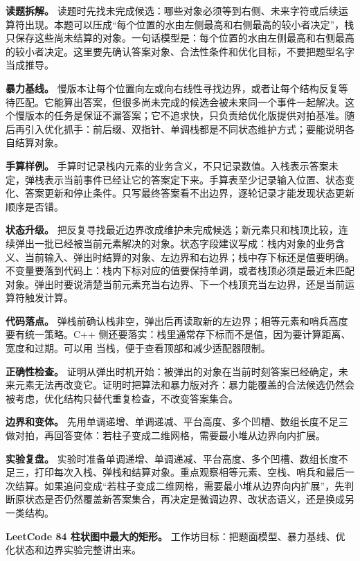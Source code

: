 \textbf{读题拆解。} 读题时先找未完成候选：哪些对象必须等到右侧、未来字符或后续运算符出现。本题可以压成“每个位置的水由左侧最高和右侧最高的较小者决定”，栈只保存这些尚未结算的对象。一句话模型是：每个位置的水由左侧最高和右侧最高的较小者决定。这里要先确认答案对象、合法性条件和优化目标，不要把题型名字当成推导。

\textbf{暴力基线。} 慢版本让每个位置向左或向右线性寻找边界，或者让每个结构反复等待匹配。它能算出答案，但很多尚未完成的候选会被未来同一个事件一起解决。这个慢版本的任务是保证不漏答案；它不追求快，只负责给优化版提供对拍基准。随后再引入优化抓手：前后缀、双指针、单调栈都是不同状态维护方式；要能说明各自结算对象。

\textbf{手算样例。} 手算时记录栈内元素的业务含义，不只记录数值。入栈表示答案未定，弹栈表示当前事件已经让它的答案定下来。手算表至少记录输入位置、状态变化、答案更新和停止条件。只写最终答案看不出边界，逐轮记录才能发现状态更新顺序是否错。

\textbf{状态升级。} 把反复寻找最近边界改成维护未完成候选；新元素只和栈顶比较，连续弹出一批已经被当前元素解决的对象。状态字段建议写成：栈内对象的业务含义、当前输入、弹出时结算的对象、左边界和右边界；栈中存下标还是值要明确。不变量要落到代码上：栈内下标对应的值要保持单调，或者栈顶必须是最近未匹配对象。弹出时要说清楚当前元素充当右边界、下一个栈顶充当左边界，还是当前运算符触发计算。

\textbf{代码落点。} 弹栈前确认栈非空，弹出后再读取新的左边界；相等元素和哨兵高度要有统一策略。C++ 侧还要落实：栈里通常存下标而不是值，因为要计算距离、宽度和过期。可以用  当栈，便于查看顶部和减少适配器限制。

\textbf{正确性检查。} 证明从弹出时机开始：被弹出的对象在当前时刻答案已经确定，未来元素无法再改变它。证明时把算法和暴力版对齐：暴力能覆盖的合法候选仍然会被考虑，优化结构只替代重复检查，不改变答案集合。

\textbf{边界和变体。} 先用单调递增、单调递减、平台高度、多个凹槽、数组长度不足三做对拍，再回答变体：若柱子变成二维网格，需要最小堆从边界向内扩展。

\textbf{实验复盘。} 实验时准备单调递增、单调递减、平台高度、多个凹槽、数组长度不足三，打印每次入栈、弹栈和结算对象。重点观察相等元素、空栈、哨兵和最后一次结算。如果追问变成“若柱子变成二维网格，需要最小堆从边界向内扩展”，先判断原状态是否仍然覆盖新答案集合，再决定是微调边界、改状态语义，还是换成另一类结构。

\noindent\textbf{LeetCode 84 柱状图中最大的矩形。} 工作坊目标：把题面模型、暴力基线、优化状态和边界实验完整讲出来。

